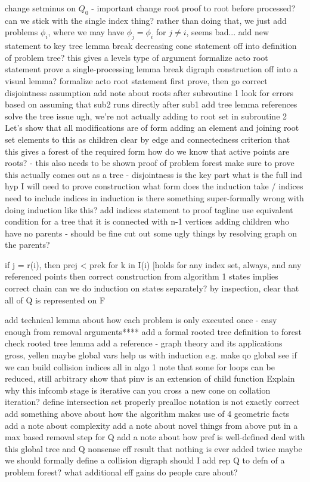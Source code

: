 \documentclass[11pt,reqno]{amsart}
\theoremstyle{definition}
\numberwithin{equation}{section}
\newcommand{\pre}{\phi}
\newcommand{\acto}{Q_0}
\begin{document}
change setminus on $\acto$ - important 
change root proof to root before processed? 
can we stick with the single index thing? 
rather than doing that, we just add problems $\pre_i$, where we may have $\pre_j = \pre_i$ for $j \not = i$, seems bad...
add new statement to key tree lemma
break decreasing cone statement off into definition of problem tree? 
this gives a levels type of argument 
formalize acto root statement
prove a single-processing lemma 
break digraph construction off into a visual lemma? 
formalize acto root statement 
first prove, then go correct disjointness assumption
add note about roots after subroutine 1 
look for errors based on assuming that sub2 runs directly after sub1
add tree lemma references
solve the tree issue
ugh, we're not actually adding to root set in subroutine 2 
Let's show that all modifications are of form
    adding an element and joining root set elements to this as children 
    clear by edge and connectedness criterion that this gives a forest of the required form 
how do we know that active points are roots? - this also needs to be shown
proof of problem forest
make sure to prove this actually comes out as a tree - disjointness is the key part
what is the full ind hyp I will need to prove construction 
what form does the induction take / indices
need to include indices in induction
is there something super-formally wrong with doing induction like this? 
add indices statement to proof tagline
use equivalent condition for a tree that it is connected with n-1 vertices
adding children who have no parents - should be fine 
cut out some ugly things by resolving graph on the parents? 

if j = r(i), then prej <  prek for k in I(i) [holds for any index set, always, and any referenced points 
then correct construction from algorithm 1 states implies correct chain 
can we do induction on states separately? 
by inspection, clear that all of Q is represented on F

add technical lemma about how each problem is only executed once - easy enough from removal arguments****
add a formal rooted tree definition to forest 
check rooted tree lemma 
add a reference - graph theory and its applications gross, yellen
maybe global vars help us with induction e.g. make qo global 
see if we can build collision indices all in algo 1 
note that some for loops can be reduced, still arbitrary
show that pinv is an extension of child function 
Explain why this infcomb stage is iterative 
can you cross a new cone on collation iteration? 
define intersection set properly
prealloc notation is not exactly correct
add something above about how the algorithm makes use of 4 geometric facts 
add a note about complexity 
add a note about novel things from above
put in a max based removal step for Q
add a note about how pref is well-defined 
deal with this global tree and Q nonsense
eff result that nothing is ever added twice
maybe we should formally define a collision digraph 
should I add rep Q to defn of a problem forest? 
what additional eff gains do people care about? 
\end{document}
